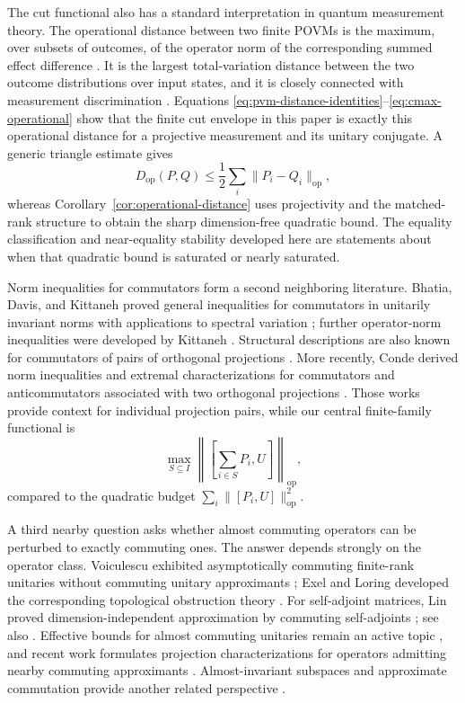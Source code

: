 \documentclass[11pt]{article}
\newcommand{\op}{\mathrm{op}}
\begin{document}
The cut functional also has a standard interpretation in quantum
measurement theory.  The operational distance between two finite POVMs is
the maximum, over subsets of outcomes, of the operator norm of the
corresponding summed effect difference
\cite{NavascuesPopescu2014,MaciejewskiZimborasOszmaniec2020}.  It is the
largest total-variation distance between the two outcome distributions over
input states, and it is closely connected with measurement discrimination
\cite{PuchalaPawelaKrawiecKukulski2018}.  Equations
\eqref{eq:pvm-distance-identities}--\eqref{eq:cmax-operational} show that the
finite cut envelope in this paper is exactly this operational distance for a
projective measurement and its unitary conjugate.  A generic triangle
estimate gives
\[
  D_{\mathrm{op}}(P,Q)
  \le \frac12\sum_i\|P_i-Q_i\|_{\op},
\]
whereas Corollary~\ref{cor:operational-distance} uses projectivity and the
matched-rank structure to obtain the sharp dimension-free quadratic bound.
The equality classification and near-equality stability developed here are
statements about when that quadratic bound is saturated or nearly saturated.

Norm inequalities for commutators form a second neighboring literature.
Bhatia, Davis, and Kittaneh proved general inequalities for commutators in
unitarily invariant norms with applications to spectral variation
\cite{BhatiaDavisKittaneh1991}; further operator-norm inequalities were
developed by Kittaneh \cite{Kittaneh2007}.  Structural descriptions are also
known for commutators of pairs of orthogonal projections
\cite{Li2004}.  More recently, Conde derived norm inequalities and extremal
characterizations for commutators and anticommutators associated with two
orthogonal projections \cite{Conde2022}.  Those works provide context for
individual projection pairs, while
our central finite-family functional is
\[
  \max_{S\subseteq I}
  \left\|
    \left[\sum_{i\in S}P_i,U\right]
  \right\|_{\op},
\]
compared to the quadratic budget
$\sum_i\|[P_i,U]\|_{\op}^2$.

A third nearby question asks whether almost commuting operators can be
perturbed to exactly commuting ones.  The answer depends strongly on the
operator class.  Voiculescu exhibited asymptotically commuting finite-rank
unitaries without commuting unitary approximants
\cite{Voiculescu1983}; Exel and Loring developed the corresponding
topological obstruction theory \cite{ExelLoring1989,ExelLoring1991}.  For
self-adjoint matrices, Lin proved dimension-independent approximation by
commuting self-adjoints \cite{Lin1997AlmostCommuting}; see also
\cite{FriisRordam1996,Hastings2009}.  Effective bounds for almost commuting
unitaries remain an active topic \cite{DorOnHallKachkovskiy2025}, and recent
work formulates projection characterizations for operators admitting nearby
commuting approximants \cite{Herrera2024,Herrera2026}.  Almost-invariant
subspaces and approximate commutation provide another related perspective
\cite{MarcouxPopovRadjavi2013}.
\end{document}
